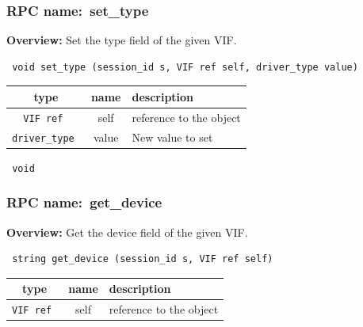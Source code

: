 \subsubsection{RPC name:~set\_type}

{\bf Overview:} 
Set the type field of the given VIF.

\begin{verbatim} void set_type (session_id s, VIF ref self, driver_type value)\end{verbatim}



 
\vspace{0.3cm}
\begin{tabular}{|c|c|p{7cm}|}
 \hline
{\bf type} & {\bf name} & {\bf description} \\ \hline
{\tt VIF ref } & self & reference to the object \\ \hline 

{\tt driver\_type } & value & New value to set \\ \hline 

\end{tabular}

\vspace{0.3cm}

{\tt 
void
}



\vspace{0.3cm}
\vspace{0.3cm}
\vspace{0.3cm}
\subsubsection{RPC name:~get\_device}

{\bf Overview:} 
Get the device field of the given VIF.

\begin{verbatim} string get_device (session_id s, VIF ref self)\end{verbatim}



 
\vspace{0.3cm}
\begin{tabular}{|c|c|p{7cm}|}
 \hline
{\bf type} & {\bf name} & {\bf description} \\ \hline
{\tt VIF ref } & self & reference to the object \\ \hline 

\end{tabular}

